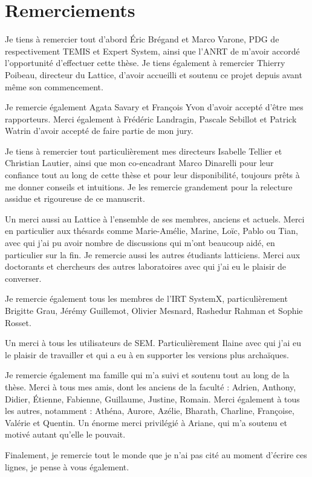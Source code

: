 \documentclass[12pt,a4paper,times,twoside,openright]{report}
\begin{document}
\chapter*{Remerciements}
Je tiens à remercier tout d'abord Éric Brégand et Marco Varone, PDG de respectivement TEMIS et Expert System, ainsi que l'ANRT de m'avoir accordé l'opportunité d'effectuer cette thèse. Je tiens également à remercier Thierry Poibeau, directeur du Lattice, d'avoir accueilli et soutenu ce projet depuis avant même son commencement.

Je remercie également Agata Savary et François Yvon d'avoir accepté d'être mes rapporteurs. Merci également à Frédéric Landragin, Pascale Sebillot et Patrick Watrin d'avoir accepté de faire partie de mon jury.

Je tiens à remercier tout particulièrement mes directeurs Isabelle Tellier et Christian Lautier, ainsi que mon co-encadrant Marco Dinarelli pour leur confiance tout au long de cette thèse et pour leur disponibilité, toujours prêts à me donner conseils et intuitions. Je les remercie grandement pour la relecture assidue et rigoureuse de ce manuscrit.

Un merci aussi au Lattice à l'ensemble de ses membres, anciens et actuels. Merci en particulier aux thésards comme Marie-Amélie, Marine, Loïc, Pablo ou Tian, avec qui j'ai pu avoir nombre de discussions qui m'ont beaucoup aidé, en particulier sur la fin. Je remercie aussi les autres étudiants latticiens. Merci aux doctorants et chercheurs des autres laboratoires avec qui j'ai eu le plaisir de converser.

Je remercie également tous les membres de l'IRT SystemX, particulièrement Brigitte Grau, Jérémy Guillemot, Olivier Mesnard, Rashedur Rahman et Sophie Rosset.

Un merci à tous les utilisateurs de SEM. Particulièrement Ilaine avec qui j'ai eu le plaisir de travailler et qui a eu à en supporter les versions plus archaïques.

Je remercie également ma famille qui m'a suivi et soutenu tout au long de la thèse. Merci à tous mes amis, dont les anciens de la faculté : Adrien, Anthony, Didier, Étienne, Fabienne, Guillaume, Justine, Romain. Merci également à tous les autres, notamment : Athéna, Aurore, Azélie, Bharath, Charline, Françoise, Valérie et Quentin. Un énorme merci privilégié à Ariane, qui m'a soutenu et motivé autant qu'elle le pouvait.

Finalement, je remercie tout le monde que je n'ai pas cité au moment d'écrire ces lignes, je pense à vous également.
\end{document}
